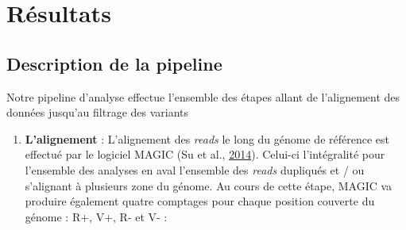 \documentclass[12pt,twoside]{reedthesis}
\providecommand{\tightlist}{%
  \setlength{\itemsep}{0pt}\setlength{\parskip}{0pt}}
\theoremstyle{definition}
\theoremstyle{definition}
\theoremstyle{remark}
\begin{document}
  \section{Résultats}\label{resultats}
  
  \subsection{Description de la
  pipeline}\label{description-de-la-pipeline}
  
  Notre pipeline d'analyse effectue l'ensemble des étapes allant de
  l'alignement des données jusqu'au filtrage des variants
  
  \begin{enumerate}
  \def\labelenumi{\arabic{enumi}.}
  \tightlist
  \item
    \textbf{L'alignement} : L'alignement des \emph{reads} le long du
    génome de référence est effectué par le logiciel MAGIC (Su et al.,
    \protect\hyperlink{ref-Su2014}{2014}). Celui-ci l'intégralité pour
    l'ensemble des analyses en aval l'ensemble des \emph{reads} dupliqués
    et / ou s'alignant à plusieurs zone du génome. Au cours de cette
    étape, MAGIC va produire également quatre comptages pour chaque
    position couverte du génome : R+, V+, R- et V- :
  

\end{enumerate}
\end{document}

